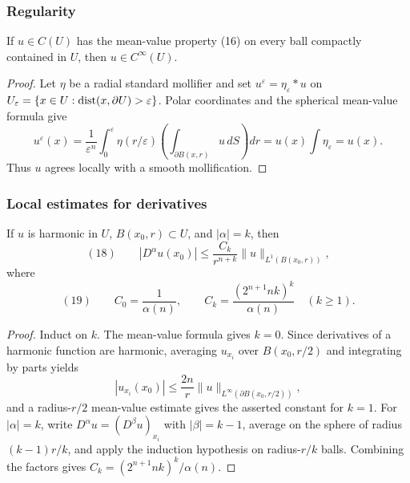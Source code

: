 \subsubsection{Regularity}
\label{sec:laplace-regularity}

\begin{theorem}[Smoothness]
\label{thm:harmonic-functions-smooth}





If $u\in C(U)$ has the mean-value property (16) on every ball compactly
contained in $U$, then $u\in C^\infty(U)$.
\end{theorem}
\begin{proof}

\sketch Let $\eta$ be a radial standard mollifier and set
$u^\varepsilon=\eta_\varepsilon*u$ on
$U_\varepsilon=\{x\in U:\operatorname{dist}(x,\partial U)>\varepsilon\}$. Polar
coordinates and the spherical mean-value formula give
$$u^\varepsilon(x)
=\frac1{\varepsilon^n}\int_0^\varepsilon
\eta(r/\varepsilon)\left(\int_{\partial B(x,r)}u\,dS\right)dr
=u(x)\int\eta_\varepsilon=u(x).$$
Thus $u$ agrees locally with a smooth mollification.
\end{proof}

\subsubsection{Local estimates for derivatives}
\label{sec:laplace-local-estimates-derivatives}

\begin{theorem}
\label{thm:harmonic-function-derivative-estimates}

If $u$ is harmonic in $U$, $B(x_0,r)\subset U$, and $|\alpha|=k$, then
$$(18)\qquad
|D^\alpha u(x_0)|\le
\frac{C_k}{r^{n+k}}\|u\|_{L^1(B(x_0,r))},$$
where
$$(19)\qquad
C_0=\frac1{\alpha(n)},
\qquad
C_k=\frac{(2^{n+1}nk)^k}{\alpha(n)}\quad(k\ge1).$$
\end{theorem}
\begin{proof}
\sketch Induct on $k$. The mean-value formula gives $k=0$. Since derivatives
of a harmonic function are harmonic, averaging $u_{x_i}$ over $B(x_0,r/2)$
and integrating by parts yields
$$|u_{x_i}(x_0)|\le\frac{2n}{r}
\|u\|_{L^\infty(\partial B(x_0,r/2))},$$
and a radius-$r/2$ mean-value estimate gives the asserted constant for $k=1$.
For $|\alpha|=k$, write $D^\alpha u=(D^\beta u)_{x_i}$ with
$|\beta|=k-1$, average on the sphere of radius $(k-1)r/k$, and apply the
induction hypothesis on radius-$r/k$ balls. Combining the factors gives
$C_k=(2^{n+1}nk)^k/\alpha(n)$.
\end{proof}

